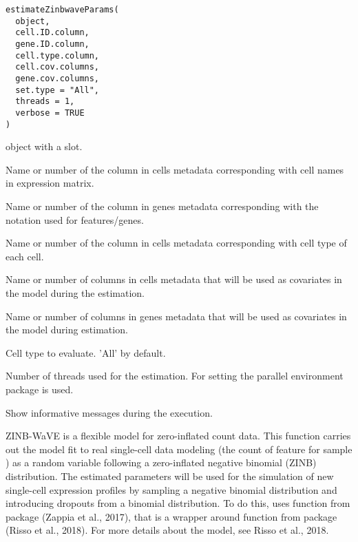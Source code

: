 \documentclass[a4paper]{book}
\begin{document}
%
\begin{Usage}
\begin{verbatim}
estimateZinbwaveParams(
  object,
  cell.ID.column,
  gene.ID.column,
  cell.type.column,
  cell.cov.columns,
  gene.cov.columns,
  set.type = "All",
  threads = 1,
  verbose = TRUE
)
\end{verbatim}
\end{Usage}
%
\begin{Arguments}
\begin{ldescription}
\item[\code{object}]  object with a
 slot.

\item[\code{cell.ID.column}] Name or number of the column in cells metadata
corresponding with cell names in expression matrix.

\item[\code{gene.ID.column}] Name or number of the column in genes metadata
corresponding with the notation used for features/genes.

\item[\code{cell.type.column}] Name or number of the column in cells metadata
corresponding with cell type of each cell.

\item[\code{cell.cov.columns}] Name or number of columns in cells metadata that
will be used as covariates in the model during the estimation.

\item[\code{gene.cov.columns}] Name or number of columns in genes metadata that will
be used as covariates in the model during estimation.

\item[\code{set.type}] Cell type to evaluate. 'All' by default.

\item[\code{threads}] Number of threads used for the estimation. For setting the
parallel environment  package is used.

\item[\code{verbose}] Show informative messages during the execution.
\end{ldescription}
\end{Arguments}
%
\begin{Details}\relax
ZINB-WaVE is a flexible model for zero-inflated count data. This function
carries out the model fit to real single-cell data modeling 
(the count of feature  for sample ) as a random variable
following a zero-inflated negative binomial (ZINB) distribution. The
estimated parameters will be used for the simulation of new single-cell
expression profiles by sampling a negative binomial distribution and
introducing dropouts from a binomial distribution.
To do this,  uses  function
from  package (Zappia et al., 2017),  that is a wrapper around
 function from  package (Risso et al., 2018).
For more details about the model, see Risso et al., 2018.
\end{Details}
\end{document}
